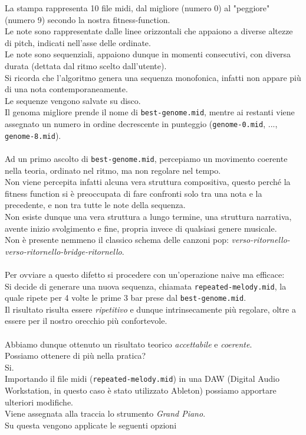 \documentclass[a4paper,12pt]{report}
\begin{document}
La stampa rappresenta 10 file midi, dal migliore (numero 0) al "peggiore" (numero 9) secondo la nostra fitness-function. \\
Le note sono rappresentate dalle linee orizzontali che appaiono a diverse altezze di pitch, indicati nell'asse delle ordinate. \\
Le note sono sequenziali, appaiono dunque in momenti consecutivi, con diversa durata (dettata dal ritmo scelto dall'utente). \\
Si ricorda che l'algoritmo genera una sequenza monofonica, infatti non appare più di una nota contemporaneamente. \\
Le sequenze vengono salvate su disco. \\
Il genoma migliore prende il nome di \texttt{best-genome.mid}, mentre ai restanti viene assegnato un numero in ordine decrescente in punteggio (\texttt{genome-0.mid}, ..., \texttt{genome-8.mid}). \\
\\
Ad un primo ascolto di \texttt{best-genome.mid}, percepiamo un movimento coerente nella teoria, ordinato nel ritmo, ma non regolare nel tempo. \\
Non viene percepita infatti alcuna vera struttura compositiva, questo perché la fitness function si è preoccupata di fare confronti solo tra una nota e la precedente, e non tra tutte le note della sequenza. \\
Non esiste dunque una vera struttura a lungo termine, una struttura narrativa, avente inizio svolgimento e fine, propria invece di qualsiasi genere musicale. \\
Non è presente nemmeno il classico schema delle canzoni pop: \textit{verso-ritornello-verso-ritornello-bridge-ritornello}. \\
\\
Per ovviare a questo difetto si procedere con un'operazione naive ma efficace: \\
Si decide di generare una nuova sequenza, chiamata \texttt{repeated-melody.mid}, la quale ripete per 4 volte le prime 3 bar prese dal \texttt{best-genome.mid}. \\
Il risultato risulta essere \textit{ripetitivo} e dunque intrinsecamente più regolare, oltre a essere per il nostro orecchio più confortevole. \\
\\
Abbiamo dunque ottenuto un risultato teorico \textit{accettabile} e \textit{coerente}. \\
Possiamo ottenere di più nella pratica? \\
Si. \\
Importando il file midi (\texttt{repeated-melody.mid}) in una DAW (Digital Audio Workstation, in questo caso è stato utilizzato Ableton) possiamo apportare ulteriori modifiche. \\
Viene assegnata alla traccia lo strumento \textit{Grand Piano}. \\
Su questa vengono applicate le seguenti opzioni
\end{document}
